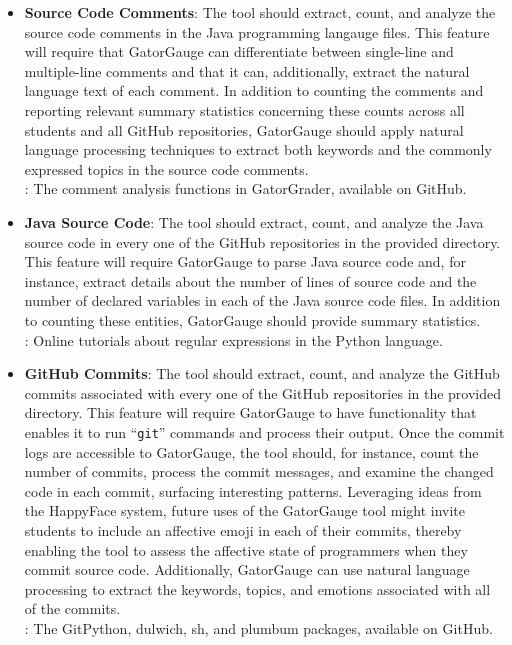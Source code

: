 \documentclass[11pt]{article}
\newcommand{\command}[1]{``\lstinline{#1}''}
\begin{document}
\begin{itemize}

  \item {\bf Source Code Comments}: The tool should extract, count, and analyze the source code comments in the Java
    programming langauge files. This feature will require that GatorGauge can differentiate between single-line and
    multiple-line comments and that it can, additionally, extract the natural language text of each comment. In addition
    to counting the comments and reporting relevant summary statistics concerning these counts across all students and
    all GitHub repositories, GatorGauge should apply natural language processing techniques to extract both keywords and
    the commonly expressed topics in the source code comments. \\[.5em] : The comment
    analysis functions in GatorGrader, available on GitHub.

  \item {\bf Java Source Code}: The tool should extract, count, and analyze the Java source code in every one of the
    GitHub repositories in the provided directory. This feature will require GatorGauge to parse Java source code and,
    for instance, extract details about the number of lines of source code and the number of declared variables in each
    of the Java source code files. In addition to counting these entities, GatorGauge should provide summary statistics.
    \\[.5em] : Online tutorials about regular expressions in the Python language.

  \item {\bf GitHub Commits}: The tool should extract, count, and analyze the GitHub commits associated with every one
    of the GitHub repositories in the provided directory. This feature will require GatorGauge to have functionality
    that enables it to run \command{git} commands and process their output. Once the commit logs are accessible to
    GatorGauge, the tool should, for instance, count the number of commits, process the commit messages, and examine the
    changed code in each commit, surfacing interesting patterns. Leveraging ideas from the HappyFace system, future uses
    of the GatorGauge tool might invite students to include an affective emoji in each of their commits, thereby
    enabling the tool to assess the affective state of programmers when they commit source code. Additionally,
    GatorGauge can use natural language processing to extract the keywords, topics, and emotions associated with all of
    the commits. \\[.5em] : The GitPython, dulwich, sh, and plumbum packages, available
    on GitHub.


\end{itemize}
\end{document}
